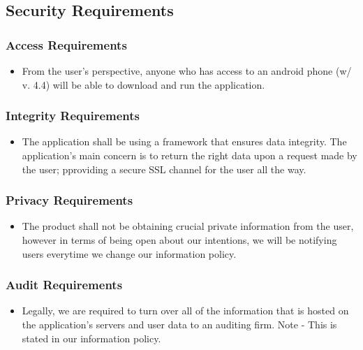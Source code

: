\documentclass[]{article}
\begin{document}

\subsection{Security Requirements}
\label{sub:security_requirements}

\subsubsection{Access Requirements}
\label{ssub:access_requirements}
\begin{itemize}
	\item From the user's perspective, anyone who has access to an android phone (w/ v. 4.4) will be able to download and run the application.
\end{itemize}

\subsubsection{Integrity Requirements}
\label{ssub:integrity_requirements}
\begin{itemize}
	\item The application shall be using a framework that ensures data integrity. The application's main concern is to return the right data upon a request made by the user; pproviding a secure SSL channel for the user all the way.
\end{itemize}

\subsubsection{Privacy Requirements}
\label{ssub:privacy_requirements}
\begin{itemize}
	\item The product shall not be obtaining crucial private information from the user, however in terms of being open about our intentions, we will be notifying users everytime we change our information policy.
\end{itemize}

\subsubsection{Audit Requirements}
\label{ssub:audit_requirements}
\begin{itemize}
	\item Legally, we are required to turn over all of the information that is hosted on the application's servers and user data to an auditing firm. Note - This is stated in our information policy.
\end{itemize}
\end{document}
